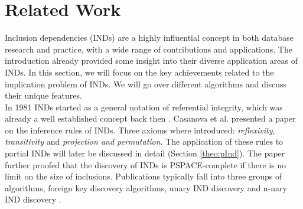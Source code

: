 
\section{Related Work}\label{sec:rel_work}

Inclusion dependencies (INDs) are a highly influential concept in both database research and practice, with a wide range of contributions and applications. The introduction already provided some insight into their diverse application areas of INDs. In this section, we will focus on the key achievements related to the implication problem of INDs. We will go over different algorithms and discuss their unique features. \\

In 1981 INDs started as a general notation of referential integrity, which was already a well established concept back then \cite{date1981referential}. Casanova et al. presented a paper on the inference rules of INDs\cite{casanova1982inclusion}. Three axioms where introduced: \textit{reflexivity}, \textit{transitivity} and \textit{projection and permutation}. The application of these rules to partial INDs will later be discussed in detail (Section \ref{theo:pInd}). The paper further proofed that the discovery of INDs is PSPACE-complete if there is no limit on the size of inclusions. Publications typically fall into three groups of algorithms, foreign key discovery algorithms, unary IND discovery and n-nary IND discovery \cite{papenbrock2017data}. \\

